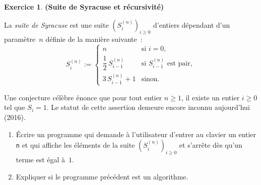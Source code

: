\documentclass[12pt]{article}
\theoremstyle{definition}
\newtheorem{Exercice}{Exercice}
\begin{document}
\begin{Exercice} {\bf (Suite de Syracuse et récursivité)}\smallskip

La {\em suite de Syracuse} est une suite
$\left(S^{(n)}_i\right)_{i \geq 0}$ d'entiers dépendant d'un paramètre~$n$
définie de la manière suivante~:
\begin{equation*}
    S^{(n)}_i :=
    \begin{cases}
        n & \mbox{si $i = 0$}, \\[.75em]
        \dfrac{1}{2}\, S^{(n)}_{i - 1}
            & \mbox{si $S^{(n)}_{i - 1}$ est pair}, \\[.75em]
        3\, S^{(n)}_{i - 1} + 1 & \mbox{sinon}.
    \end{cases}
\end{equation*}
\smallskip

Une conjecture célèbre énonce que pour tout entier $n \geq 1$, il existe
un entier $i \geq 0$ tel que $S_i = 1$. Le statut de cette assertion 
demeure encore inconnu aujourd'hui (2016).
\smallskip

\begin{enumerate}
    \item Écrire un programme qui demande à l'utilisateur d'entrer au
    clavier un entier {\tt n} et qui affiche les éléments de la suite
    $\left(S^{(n)}_i\right)_{i \geq 0}$ et s'arrête dès qu'un
    terme est égal à~$1$.
    \item Expliquer si le programme précédent est un algorithme.
\end{enumerate}
\end{Exercice}
\bigskip
\end{document}
